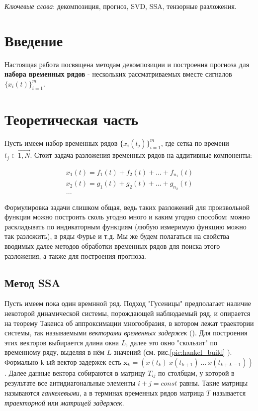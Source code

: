 	\textit{Ключевые слова}: {\small декомпозиция, прогноз, SVD, SSA, тензорные разложения}.
	
	
	\section*{Введение}\label{Intro}
	
		Настоящая работа посвящена методам декомпозиции и построения прогноза для \textbf{набора временных рядов} - нескольких рассматриваемых вместе сигналов $ \{x_i(t)\}_{i=1}^m $.
	    
	    \section*{Теоретическая часть}
	    
	    	Пусть имеем набор временных рядов $ \{x_i(t_j)\}_{i = 1}^{m} $, где сетка по времени $ t_j \in \overrightarrow{1, N} $. Стоит задача разложения временных рядов на аддитивные компоненты: 
	    	
	    	\begin{gather*}
	    		x_1(t) = f_1(t) + f_2(t) + \ldots + f_{n_1}(t) \\
	    		x_2(t) = g_1(t) + g_2(t) + \ldots + g_{n_2}(t) \\
	    			   ...
	    	\end{gather*}
	    	
	    	Формулировка задачи слишком общая, ведь таких разложений для произвольной функции можно построить сколь угодно много и каким угодно способом: можно раскладывать по индикаторным функциям (любую измеримую функцию можно так разложить), в ряды Фурье и т.д. Мы же будем полагаться на свойства вводимых далее методов обработки временных рядов для поиска этого разложения, а также для построения прогноза.
	    
	    	\subsection*{Метод SSA}
	    	
	    	Пусть имеем пока один времнной ряд. Подход "Гусеницы" предполагает наличие некоторой динамической системы, порождающей наблюдаемый ряд, и опирается на теорему Такенса об аппроксимации многообразия, в котором лежат траектории системы, так называемыми \textit{векторами временных задержек} (\cite{citeulike:2735031}). Для построения этих векторов выбирается длина окна $ L $, далее это окно "скользит" по временному ряду, выделяя в нём $ L $ значений (см. рис.\ref{pic:hankel_build} ). Формально k-ый вектор задержек есть $ \mathbf{x}_k = ( x(t_k) \  x(t_{k+1}) \  \ldots \  x(t_{k + L - 1}) ) $. Далее данные вектора собираются в матрицу $ T_{ij} $ по столбцам, у которой в результате все антидиагональные элементы $ i + j = const $ равны. Такие матрицы называются \textit{ганкелевыми}, а в терминах временных рядов матрица $ T $ называется \textit{траекторной} или \textit{матрицей задержек}.
	    	
